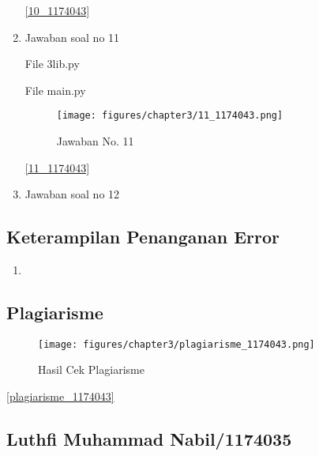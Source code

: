 \begin{enumerate}
				\ref{10_1174043}
				
			\item Jawaban soal no 11
			
				File 3lib.py
				
				
				File main.py
				
				
				\begin{figure} [ht]
					\centerline{\texttt{[image: figures/chapter3/11\_1174043.png]}}
					\caption{Jawaban No. 11}
					\label{11}
				\end{figure}

				\ref{11_1174043}
				
			\item Jawaban soal no 12
			
		
		\end{enumerate}
		
		\subsection{Keterampilan Penanganan Error}
			\begin{enumerate}
				\item 
			
			\end{enumerate}
			
		\subsection{Plagiarisme}
			\begin{figure} [ht]
					\centerline{\texttt{[image: figures/chapter3/plagiarisme\_1174043.png]}}
					\caption{Hasil Cek Plagiarisme}
					\label{plagiarisme}
				\end{figure}

			\ref{plagiarisme_1174043}

\subsection{Luthfi Muhammad Nabil/1174035}
